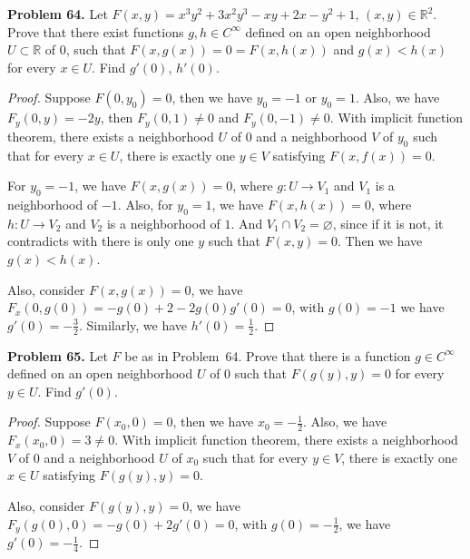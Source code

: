 \documentclass[12pt,leqno]{amsart}
\theoremstyle{definition}
\begin{document}
\medskip

\noindent
{\bf Problem 64.}
Let $F(x,y)=x^3y^2+3x^2y^3-xy+2x-y^2+1$, $(x,y)\in\mathbb{R}^2$. Prove that
there exist functions $g,h\in C^\infty$ defined on an open neighborhood
$U\subset\mathbb{R}$ of $0$, such that $F(x,g(x))=0=F(x,h(x))$ and
$g(x)<h(x)$ for every $x\in U$. Find $g'(0)$, $h'(0)$.
\begin{proof}
Suppose $F(0,y_0) = 0$, then we have $y_0 = -1$ or $y_0 = 1$. Also, we have $F_y(0,y) = -2y$, then $F_y(0,1) \neq 0$ and $F_y(0,-1) \neq 0$. With implicit function theorem, there exists a neighborhood $U$ of $0$ and a neighborhood $V$ of $y_0$ such that for every $x\in U$, there is exactly one $y\in V$ satisfying $F(x, f(x)) = 0$. 

For $y_0 = -1$, we have $F(x, g(x)) = 0$, where $g:U \to V_1$ and $V_1$ is a neighborhood of $-1$. Also, for $y_0 = 1$, we have $F(x, h(x)) = 0$, where $h:U \to V_2$ and $V_2$ is a neighborhood of $1$. And $V_1 \cap V_2 = \varnothing$, since if it is not, it contradicts with there is only one $y$ such that $F(x,y) = 0$. Then we have $g(x) < h(x)$. 

Also, consider $F(x, g(x)) = 0$, we have $F_x(0,g(0)) = - g(0) + 2 - 2g(0) g'(0) = 0$, with $g(0) = -1$ we have $g'(0) = -\frac{3}{2}$. Similarly, we have $h'(0) = \frac{1}{2}$.
\end{proof}

\medskip

\noindent
{\bf Problem 65.}
Let $F$ be as in Problem~64. Prove that there is a function $g\in C^\infty$
defined on an open neighborhood $U$ of $0$ such that $F(g(y),y)=0$
for every $y\in U$. Find $g'(0)$.
\begin{proof}
Suppose $F(x_0, 0) = 0$, then we have $x_0 = -\frac{1}{2}$. Also, we have $F_x(x_0, 0) = 3 \neq 0$. With implicit function theorem, there exists a neighborhood $V$ of $0$ and a neighborhood $U$ of $x_0$ such that for every $y\in V$, there is exactly one $x\in U$ satisfying $F(g(y), y) = 0$.

Also, consider $F(g(y), y) = 0$, we have $F_y(g(0), 0) = - g(0) + 2 g'(0) = 0$, with $g(0) = -\frac{1}{2}$, we have $g'(0) = -\frac{1}{4}$.
\end{proof}

\medskip
\end{document}
